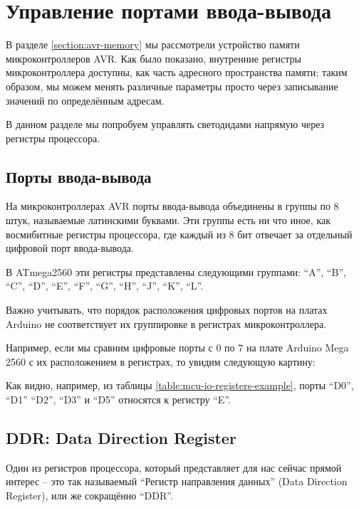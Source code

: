 \documentclass[../sparc.tex]{subfiles}
\begin{document}
\newpage
\section{Управление портами ввода-вывода}

В разделе \ref{section:avr-memory} мы рассмотрели устройство памяти
микроконтроллеров AVR.  Как было показано, внутренние регистры микроконтроллера
доступны, как часть адресного пространства памяти; таким образом, мы можем
менять различные параметры просто через записывание значений по определённым
адресам.

В данном разделе мы попробуем управлять светодидами напрямую через регистры
процессора.

\subsection{Порты ввода-вывода}
\label{subsection:io-ports}

На микроконтроллерах AVR порты ввода-вывода объединены в группы по 8 штук,
называемые латинскими буквами.  Эти группы есть ни что иное, как восмибитные
регистры процессора, где каждый из 8 бит отвечает за отдельный цифровой порт
ввода-вывода.

В ATmega2560 эти регистры представлены\cite[96-100]{avr:atmega2560-datasheet}
следующими группами: ``A'', ``B'', ``C'', ``D'', ``E'', ``F'', ``G'', ``H'',
``J'', ``K'', ``L''.

Важно учитывать, что порядок расположения цифровых портов на платах Arduino не
соответствует их группировке в регистрах микроконтроллера.

Например, если мы сравним цифровые порты с 0 по 7 на плате Arduino Mega 2560 с
их расположением в регистрах, то увидим следующую картину:


Как видно, например, из таблицы \ref{table:mcu-io-registers-example}, порты
``D0'', ``D1'' ``D2'', ``D3'' и ``D5'' относятся к регистру ``E''.

\subsection{DDR: Data Direction Register}

Один из регистров процессора, который представляет для нас сейчас прямой интерес
-- это так называемый ``Регистр направления данных'' (Data Direction Register),
или же сокращённо ``DDR''.
\end{document}
